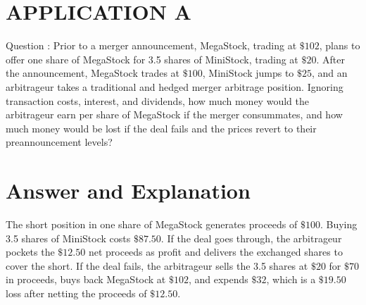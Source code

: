 \documentclass[11pt]{article}
\begin{document}
\section*{APPLICATION A}
Question : Prior to a merger announcement, MegaStock, trading at $\$ 102$, plans to offer one share of MegaStock for 3.5 shares of MiniStock, trading at $\$ 20$. After the announcement, MegaStock trades at $\$ 100$, MiniStock jumps to $\$ 25$, and an arbitrageur takes a traditional and hedged merger arbitrage position. Ignoring transaction costs, interest, and dividends, how much money would the arbitrageur earn per share of MegaStock if the merger consummates, and how much money would be lost if the deal fails and the prices revert to their preannouncement levels?

\section*{Answer and Explanation}
The short position in one share of MegaStock generates proceeds of $\$ 100$. Buying 3.5 shares of MiniStock costs $\$ 87.50$. If the deal goes through, the arbitrageur pockets the $\$ 12.50$ net proceeds as profit and delivers the exchanged shares to cover the short. If the deal fails, the arbitrageur sells the 3.5 shares at $\$ 20$ for $\$ 70$ in proceeds, buys back MegaStock at $\$ 102$, and expends $\$ 32$, which is a $\$ 19.50$ loss after netting the proceeds of $\$ 12.50$.
\end{document}
